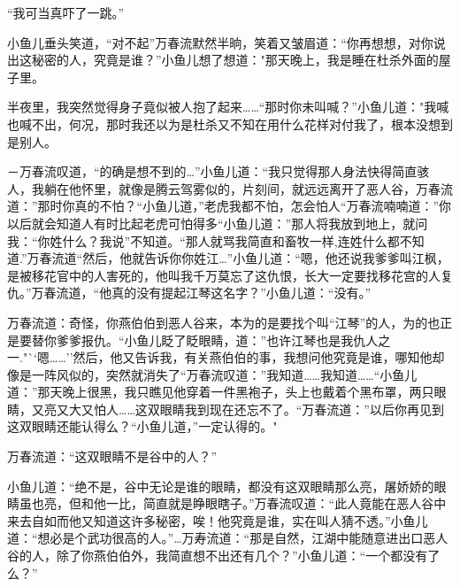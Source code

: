 \documentclass[12pt,oneside]{book}
\begin{document}
``我可当真吓了一跳。''

小鱼儿垂头笑道，``对不起''万春流默然半晌，笑着又皱眉道：``你再想想，对你说出这秘密的人，究竟是谁？''小鱼儿想了想道："那天晚上，我是睡在杜杀外面的屋子里。

半夜里，我突然觉得身子竟似被人抱了起来\ldots\ldots{}``那时你未叫喊？''小鱼儿道："我喊也喊不出，何况，那时我还以为是杜杀又不知在用什么花样对付我了，根本没想到是别人。

－万春流叹道，``的确是想不到的\ldots{}''小鱼儿道：``我只觉得那人身法快得简直骇人，我躺在他怀里，就像是腾云驾雾似的，片刻间，就远远离开了恶人谷，万春流道：''那时你真的不怕？``小鱼儿道，''老虎我都不怕，怎会怕人``万春流喃喃道：''你以后就会知道人有时比起老虎可怕得多``小鱼儿道：''那人将我放到地上，就问我：``你姓什么？我说''不知道。``那人就骂我简直和畜牧一样,连姓什么都不知道.''万春流道``然后，他就告诉你你姓江\ldots{}''小鱼儿道：``嗯，他还说我爹爹叫江枫，是被移花官中的人害死的，他叫我千万莫忘了这仇恨，长大一定要找移花宫的人复仇。''万春流道，``他真的没有提起江琴这名字？''小鱼儿道：``没有。''

万春流道：奇怪，你燕伯伯到恶人谷来，本为的是要找个叫``江琴''的人，为的也正是要替你爹爹报仇。``小鱼儿眨了眨眼睛，道：''也许江琴也是我仇人之一."``嗯\ldots\ldots{}''然后，他又告诉我，有关燕伯伯的事，我想问他究竟是谁，哪知他却像是一阵风似的，突然就消失了``万春流叹道：''我知道\ldots\ldots 我知道\ldots\ldots{}``小鱼儿道：''那天晚上很黑，我只瞧见他穿着一件黑袍子，头上也戴着个黑布罩，两只眼睛，又亮又大又怕人\ldots\ldots 这双眼睛我到现在还忘不了。``万春流道：''以后你再见到这双眼睛还能认得么？``小鱼儿道，''一定认得的。"

万春流道：``这双眼睛不是谷中的人？''

小鱼儿道：``绝不是，谷中无论是谁的眼睛，都没有这双眼睛那么亮，屠娇娇的眼睛虽也亮，但和他一比，简直就是睁眼瞎子。''万春流叹道：``此人竟能在恶人谷中来去自如而他又知道这许多秘密，唉！他究竟是谁，实在叫人猜不透。''小鱼儿道：``想必是个武功很高的人。''\ldots 万寿流道：``那是自然，江湖中能随意进出口恶人谷的人，除了你燕伯伯外，我简直想不出还有几个？''小鱼儿道：``一个都没有了么？''
\end{document}
